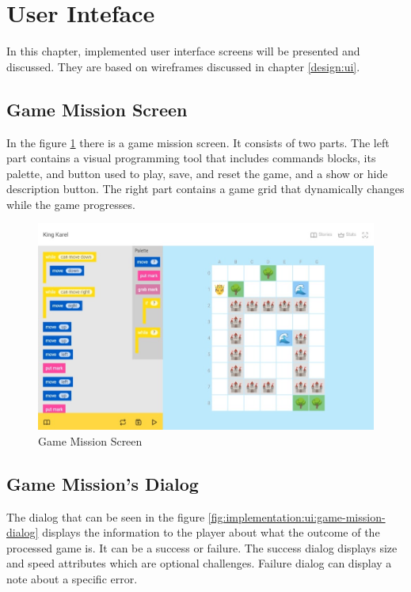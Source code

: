 \section{User Inteface}

In this chapter, implemented user interface screens will be presented and discussed.
They are based on wireframes discussed in chapter \ref{design:ui}.

\subsection{Game Mission Screen}

In the figure \ref{fig:implementation:ui:game-mission} there is a game mission screen.
It consists of two parts.
The left part contains a visual programming tool that includes commands blocks, its palette, and button used to play, save, and reset the game, and a show or hide description button.
The right part contains a game grid that dynamically changes while the game progresses.

\begin{figure}
    \centering
    \includegraphics[width=1\linewidth]{assets/implementation/ui/kingkarel_game_mission.jpeg}
    \caption{Game Mission Screen}
    \label{fig:implementation:ui:game-mission}
\end{figure}

\subsection{Game Mission's Dialog}

The dialog that can be seen in the figure \ref{fig:implementation:ui:game-mission-dialog} displays the information to the player about what the outcome of the processed game is.
It can be a success or failure.
The success dialog displays size and speed attributes which are optional challenges.
Failure dialog can display a note about a specific error.


